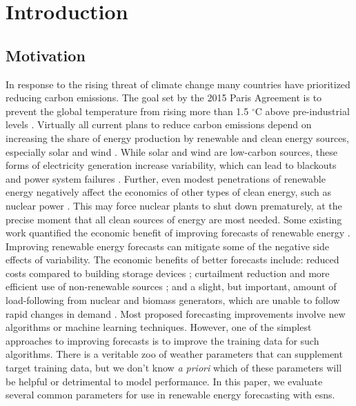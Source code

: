 \section{Introduction}
\subsection{Motivation}
In response to the rising threat of climate change many countries have prioritized reducing carbon emissions. The goal set by the 2015 Paris
Agreement is to prevent the global temperature from rising more than 1.5
$^\circ$C above pre-industrial levels \cite{noauthor_paris_nodate}. Virtually
all current plans to reduce carbon emissions depend on increasing the share of
energy production by renewable and clean energy sources, especially solar and
wind \cite{cany_nuclear_2018, chilvers_realising_2017,99th_general_assembly_illinois_2016,isee_illinois_2015}.
 While solar and wind are low-carbon sources, these
forms of electricity generation increase variability, which can lead to
blackouts and power system failures
\cite{haes_alhelou_survey_2019}. Further, even modest penetrations of renewable
energy negatively affect the economics of other types of clean energy, such as
nuclear power
\cite{cany_nuclear_2018,keppler_carbon_2011,illinois_commerce_commision_icc_potential_2015}. This may force nuclear plants to shut down prematurely, at the
precise moment that all clean sources of energy are most needed. Some existing
work quantified the economic benefit of improving forecasts of
renewable energy \cite{wang_quantifying_2016, mc_garrigle_quantifying_2015, brancucci_martinez-anido_value_2016}. Improving renewable energy forecasts can
mitigate some of the negative side effects of variability. The economic
benefits of better  forecasts include: reduced costs compared to building
storage devices \cite{wang_quantifying_2016}; curtailment reduction and more
efficient use of non-renewable sources \cite{mc_garrigle_quantifying_2015}; and
a slight, but important, amount of load-following from nuclear and biomass
generators, which are unable to follow rapid changes in demand
\cite{brancucci_martinez-anido_value_2016}. Most proposed forecasting
improvements involve new algorithms or machine learning techniques. However,
one of the simplest approaches to improving forecasts is to improve the
training data for such algorithms. There is a veritable zoo of weather
parameters that can supplement target training data, but we don't know \textit{a
priori} which of these parameters will be helpful or detrimental to model
performance. In this paper, we evaluate several common parameters for use
in renewable energy forecasting with \glspl{esn}.

